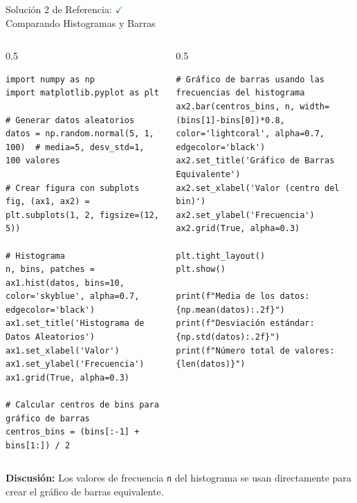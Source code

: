 \documentclass[10pt]{beamer}
\begin{document}
\begin{frame}[fragile]{Solución 2 de Referencia: \hfill \textcolor{green}{$\checkmark$} \\ Comparando Histogramas y Barras}
\begin{columns}
\begin{column}{0.5\textwidth}
\begin{verbatim}
import numpy as np
import matplotlib.pyplot as plt

# Generar datos aleatorios
datos = np.random.normal(5, 1, 100)  # media=5, desv_std=1, 100 valores

# Crear figura con subplots
fig, (ax1, ax2) = plt.subplots(1, 2, figsize=(12, 5))

# Histograma
n, bins, patches = ax1.hist(datos, bins=10, color='skyblue', alpha=0.7, edgecolor='black')
ax1.set_title('Histograma de Datos Aleatorios')
ax1.set_xlabel('Valor')
ax1.set_ylabel('Frecuencia')
ax1.grid(True, alpha=0.3)

# Calcular centros de bins para gráfico de barras
centros_bins = (bins[:-1] + bins[1:]) / 2
\end{verbatim}
\end{column}
\begin{column}{0.5\textwidth}
\begin{verbatim}
# Gráfico de barras usando las frecuencias del histograma
ax2.bar(centros_bins, n, width=(bins[1]-bins[0])*0.8, color='lightcoral', alpha=0.7, edgecolor='black')
ax2.set_title('Gráfico de Barras Equivalente')
ax2.set_xlabel('Valor (centro del bin)')
ax2.set_ylabel('Frecuencia')
ax2.grid(True, alpha=0.3)

plt.tight_layout()
plt.show()

print(f"Media de los datos: {np.mean(datos):.2f}")
print(f"Desviación estándar: {np.std(datos):.2f}")
print(f"Número total de valores: {len(datos)}")
\end{verbatim}
\end{column}
\end{columns}
\vspace{0.3cm}
\textbf{Discusión:} Los valores de frecuencia \texttt{n} del histograma se usan directamente para crear el gráfico de barras equivalente.
\end{frame}
\end{document}
